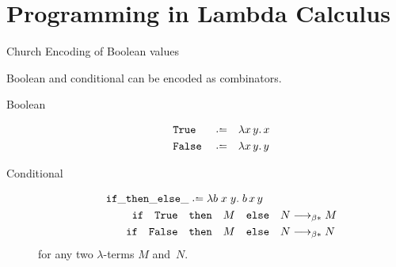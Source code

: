 \section{Programming in Lambda Calculus}
\begin{frame}{Church Encoding of Boolean values}
  
Boolean and conditional can be encoded as combinators.
  
\begin{description}
  \item[Boolean]
    \begin{align*}
      & \mathtt{True}  && \defeq && \lambda x\,y.\, x \\
      & \mathtt{False} && \defeq && \lambda x\,y.\, y
    \end{align*}

  \item[Conditional]
    \begin{align*}
      \mathtt{if}\_\mathtt{then}\_\mathtt{else}\_
      & \defeq \lambda b\;x\;y.\;b\,x\,y  \\
      \mathtt{if} \quad\mathtt{True} \quad & \mathtt{then}\quad M\quad\mathtt{else}\quad
      N  \reduce M \\
      \mathtt{if} \quad\mathtt{False} \quad &\mathtt{then}\quad M\quad\mathtt{else}\quad
      N \reduce N
    \end{align*}
    for any two $\lambda$-terms $M$ and~$N$.
\end{description}
\end{frame}
